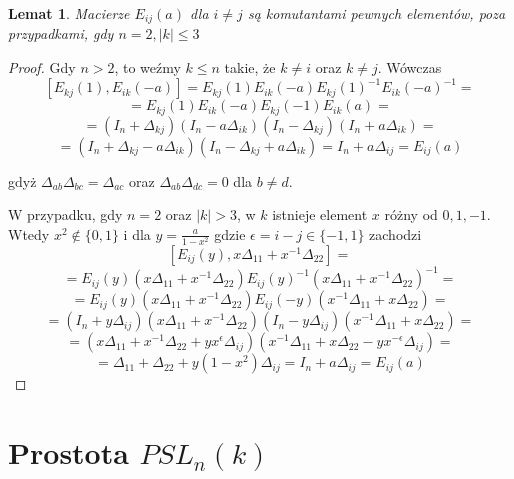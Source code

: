 \documentclass[licencjacka]{pracamgr}
\newtheorem{lemma}{Lemat}[section]
\begin{document}
\begin{lemma}
  Macierze $E_{i j}(a)$ dla $i \ne j$ są komutantami pewnych elementów, poza przypadkami, gdy $n = 2, |k| \le 3$
\end{lemma}
\begin{proof}
  Gdy $n > 2$, to weźmy $k \le n$ takie, że $k \ne i$ oraz $k \ne j$. Wówczas
  $$ [ E_{k j}(1), E_{i k}(-a) ] = E_{k j}(1) E_{i k}(-a) E_{k j}(1)^{-1} E_{i k}(-a) ^{-1} = $$
  $$ = E_{k j}(1) E_{i k}(-a) E_{k j}(-1) E_{i k}(a) = $$
  $$ = (I_n + \Delta_{k j})(I_n -a \Delta_{i k})(I_n - \Delta_{k j}) (I_n + a \Delta_{i k}) = $$
  $$ = (I_n + \Delta_{k j} - a \Delta_{i k}) (I_n - \Delta_{k j} + a \Delta_{i k}) = I_n + a \Delta_{i j} = E_{i j}(a)$$

  gdyż $\Delta_{a b} \Delta_{b c} = \Delta_{a c}$ oraz $\Delta_{a b} \Delta_{d c} = 0$ dla $b \ne d$.

  W przypadku, gdy $n = 2$ oraz $|k| > 3$, w $k$ istnieje element $x$ różny od $0, 1, -1$.
  Wtedy $x^2 \not \in \{0, 1\}$ i dla $y = \frac{a}{1 - x^2}$ gdzie $\epsilon = i - j \in \{-1, 1\}$ zachodzi
  $$ [ E_{i j}(y), x \Delta_{1 1} + x^{-1} \Delta_{2 2}] = $$
  $$ = E_{i j}(y)(x \Delta_{1 1} + x^{-1} \Delta_{2 2}) E_{i j}(y)^{-1} (x \Delta_{1 1} + x^{-1} \Delta_{2 2})^{-1} = $$
  $$ = E_{i j}(y)(x \Delta_{1 1} + x^{-1} \Delta_{2 2}) E_{i j}(-y) (x^{-1} \Delta_{1 1} + x \Delta_{2 2}) = $$
  $$ = (I_n + y \Delta_{i j})(x \Delta_{1 1} + x^{-1} \Delta_{2 2}) (I_n -y \Delta_{i j}) (x^{-1} \Delta_{1 1} + x \Delta_{2 2}) = $$
  $$ = (x \Delta_{1 1} + x^{-1} \Delta_{2 2} + y x^\epsilon \Delta_{i j}) (x^{-1} \Delta_{1 1} + x \Delta_{2 2} - y x^{-\epsilon} \Delta_{i j}) = $$
  $$ = \Delta_{1 1} + \Delta_{2 2} + y (1-x^2) \Delta_{i j}= I_n + a \Delta_{i j} = E_{i j}(a) $$
\end{proof}


\section{Prostota $PSL_n(k)$}
\end{document}
